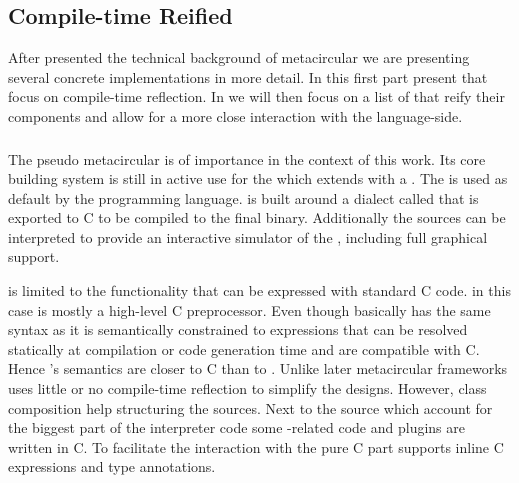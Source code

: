 \subsection{Compile-time Reified \VMs}
After presented the technical background of metacircular \VMs we are presenting several concrete implementations in more detail.
In this first part present \VMs that focus on compile-time reflection.
In  we will then focus on a list of \VMs that reify their components and allow for a more close interaction with the language-side.


\subsubsection*{\Squeak \ST \VM}
The pseudo metacircular \Squeak \VM\cite{Inga97a} is of importance in the context of this work.
Its core building system is still in active use for the  which extends \Squeak with a \JIT.
The \Cog \VM is used as default by the  programming language.
\Squeak is built around a \ST dialect called \Slang that is exported to C to be compiled to the final \VM binary.
Additionally the \Slang sources can be interpreted to provide an interactive simulator of the \VM, including full graphical support.

\Slang is limited to the functionality that can be expressed with standard C code.
\Slang in this case is mostly a high-level C preprocessor.
Even though \Slang basically has the same syntax as \ST it is semantically constrained to expressions that can be resolved statically at compilation or code generation time and are compatible with C.
Hence \Slang's semantics are closer to C than to \ST.
Unlike later metacircular frameworks \Squeak uses little or no compile-time reflection to simplify the \VM designs.
However, class composition help structuring the sources.
Next to the \Slang source which account for the biggest part of the interpreter code some \OS-related code and plugins are written in C.
To facilitate the interaction with the pure C part \Slang supports inline C expressions and type annotations.

